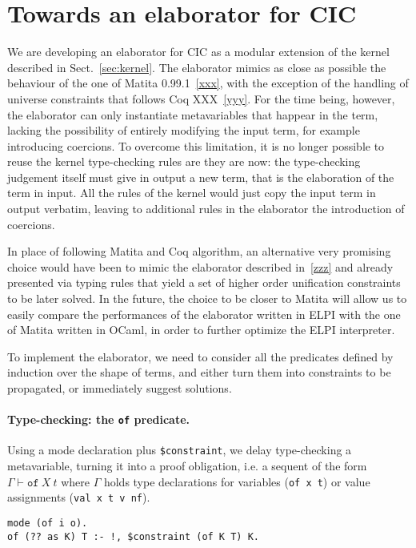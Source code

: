 \documentclass{easychair}
\begin{document}
\section{Towards an elaborator for CIC}\label{sec:elaborator}
We are developing an elaborator for CIC as a modular extension of the kernel described in Sect.~\ref{sec:kernel}. The elaborator mimics as close as possible the behaviour of the one of Matita 0.99.1~\ref{xxx}, with the exception of the handling of universe constraints that follows Coq XXX~\ref{yyy}. For the time being, however, the elaborator can only instantiate metavariables that happear in the term, lacking the possibility of entirely modifying the input term, for example introducing coercions. To overcome this limitation, it is no longer possible to reuse the kernel type-checking rules are they are now: the type-checking judgement itself must give in output a new term, that is the elaboration of the term in input. All the rules of the kernel would just copy the input term in output verbatim, leaving to additional rules in the elaborator the introduction of coercions.

In place of following Matita and Coq algorithm, an alternative very promising choice would have been to mimic the elaborator described in~\ref{zzz} and already presented via typing rules that yield a set of higher order unification constraints to be later solved. In the future, the choice to be closer to Matita will allow us to easily compare the performances of the elaborator written in ELPI with the one of Matita written in OCaml, in order to further optimize the ELPI interpreter.

To implement the elaborator, we need to consider all the predicates defined by induction over the shape of terms, and either turn them into constraints to be propagated, or immediately suggest solutions.

\paragraph{Type-checking: the \texttt{of} predicate.}
Using a mode declaration plus \verb+$constraint+, we delay type-checking a
metavariable, turning it into a proof obligation, i.e. a sequent of the form $\Gamma \vdash \mathtt{of}~X~t$ where $\Gamma$ holds type declarations for variables (\verb+of x t+) or value assignments (\verb+val x t v nf+).

\begin{verbatim}
mode (of i o).
of (?? as K) T :- !, $constraint (of K T) K.
\end{verbatim}
\end{document}
